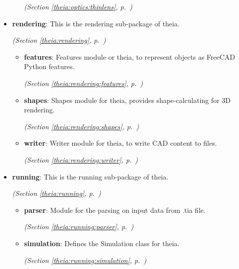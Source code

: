 \begin{itemize}
\begin{itemize}
  \textit{(Section \ref{theia:optics:thinlens}, p.~\pageref{theia:optics:thinlens})}

  \end{itemize}
\item \textbf{rendering}: This is the rendering sub-package of theia.



  \textit{(Section \ref{theia:rendering}, p.~\pageref{theia:rendering})}

  \begin{itemize}
\setlength{\parskip}{0ex}
    \item \textbf{features}: Features module or theia, to represent objects as FreeCAD Python features.



  \textit{(Section \ref{theia:rendering:features}, p.~\pageref{theia:rendering:features})}

    \item \textbf{shapes}: Shapes module for theia, provides shape-calculating for 3D rendering.



  \textit{(Section \ref{theia:rendering:shapes}, p.~\pageref{theia:rendering:shapes})}

    \item \textbf{writer}: Writer module for theia, to write CAD content to files.



  \textit{(Section \ref{theia:rendering:writer}, p.~\pageref{theia:rendering:writer})}

  \end{itemize}
\item \textbf{running}: This is the running sub-package of theia.



  \textit{(Section \ref{theia:running}, p.~\pageref{theia:running})}

  \begin{itemize}
\setlength{\parskip}{0ex}
    \item \textbf{parser}: Module for the parsing on input data from .tia file.



  \textit{(Section \ref{theia:running:parser}, p.~\pageref{theia:running:parser})}

    \item \textbf{simulation}: Defines the Simulation class for theia.



  \textit{(Section \ref{theia:running:simulation}, p.~\pageref{theia:running:simulation})}


\end{itemize}
\end{itemize}
